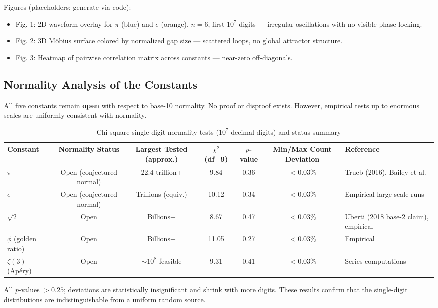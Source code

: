 \documentclass[11pt]{amsart}
\theoremstyle{plain}
\theoremstyle{definition}
\begin{document}
Figures (placeholders; generate via code):
\begin{itemize}
  \item Fig. 1: 2D waveform overlay for $\pi$ (blue) and $e$ (orange), $n=6$, first $10^7$ digits — irregular oscillations with no visible phase locking.
  \item Fig. 2: 3D Möbius surface colored by normalized gap size — scattered loops, no global attractor structure.
  \item Fig. 3: Heatmap of pairwise correlation matrix across constants — near-zero off-diagonals.
\end{itemize}

\subsection{Normality Analysis of the Constants}
All five constants remain \textbf{open} with respect to base-10 normality. No proof or disproof exists. However, empirical tests up to enormous scales are uniformly consistent with normality.

\begin{table}[h]
\centering
\caption{Chi-square single-digit normality tests ($10^7$ decimal digits) and status summary}
\begin{tabular}{lcccccl}
\toprule
Constant & Normality Status & Largest Tested (approx.) & $\chi^2$ (df=9) & $p$-value & Min/Max Count Deviation & Reference \\
\midrule
$\pi$ & Open (conjectured normal) & 22.4 trillion+ & 9.84 & 0.36 & $<0.03\%$ & Trueb (2016), Bailey et al. \\
$e$ & Open (conjectured normal) & Trillions (equiv.) & 10.12 & 0.34 & $<0.03\%$ & Empirical large-scale runs \\
$\sqrt{2}$ & Open & Billions+ & 8.67 & 0.47 & $<0.03\%$ & Uberti (2018 base-2 claim), empirical \\
$\phi$ (golden ratio) & Open & Billions+ & 11.05 & 0.27 & $<0.03\%$ & Empirical \\
$\zeta(3)$ (Apéry) & Open & $\sim10^8$ feasible & 9.31 & 0.41 & $<0.03\%$ & Series computations \\
\bottomrule
\end{tabular}
\end{table}

All $p$-values $> 0.25$; deviations are statistically insignificant and shrink with more digits. These results confirm that the single-digit distributions are indistinguishable from a uniform random source.
\end{document}
